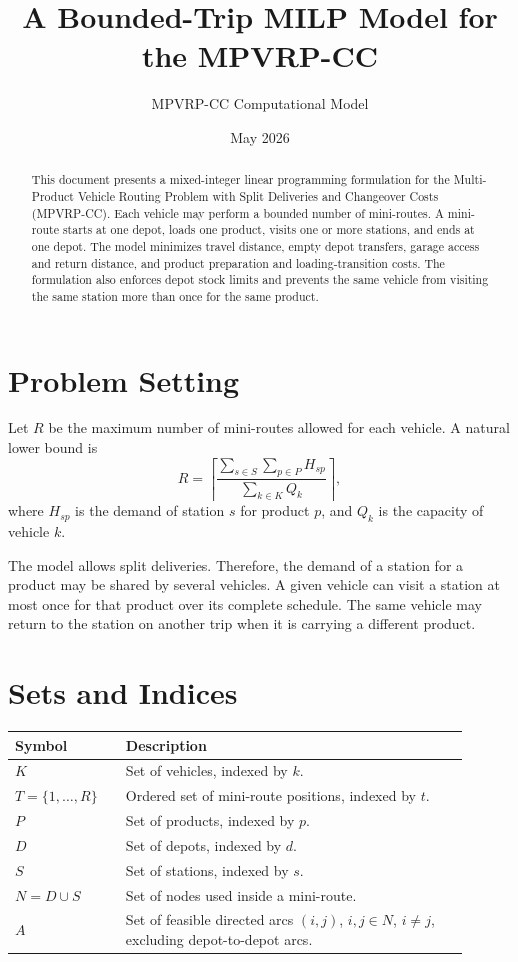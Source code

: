 \documentclass[11pt,a4paper]{article}
\title{\textbf{A Bounded-Trip MILP Model for the MPVRP-CC}}
\author{MPVRP-CC Computational Model}
\date{May 2026}
\begin{document}
\maketitle

\begin{abstract}
This document presents a mixed-integer linear programming formulation for the
Multi-Product Vehicle Routing Problem with Split Deliveries and Changeover
Costs (MPVRP-CC). Each vehicle may perform a bounded
number of mini-routes. A mini-route starts at one depot, loads one product,
visits one or more stations, and ends at one depot. The model minimizes travel
distance, empty depot transfers, garage access and return distance, and product
preparation and loading-transition costs. The formulation also enforces depot stock limits and prevents
the same vehicle from visiting the same station more than once for the same
product.
\end{abstract}

\section{Problem Setting}

Let \(R\) be the maximum number of mini-routes allowed for each vehicle. A
natural lower bound is
\[
    R =
    \left\lceil
    \frac{\sum_{s \in S}\sum_{p \in P} H_{sp}}
         {\sum_{k \in K} Q_k}
    \right\rceil ,
\]
where \(H_{sp}\) is the demand of station \(s\) for product \(p\), and \(Q_k\)
is the capacity of vehicle \(k\).

The model allows split deliveries. Therefore, the demand of a station for a
product may be shared by several vehicles. A given vehicle can visit a station
at most once for that product over its complete schedule. The same vehicle may
return to the station on another trip when it is carrying a different product.

\section{Sets and Indices}

\begin{table}[h]
\centering
\begin{tabular}{p{0.22\linewidth}p{0.68\linewidth}}
\toprule
Symbol & Description \\
\midrule
\(K\) & Set of vehicles, indexed by \(k\). \\
\(T=\{1,\ldots,R\}\) & Ordered set of mini-route positions, indexed by \(t\). \\
\(P\) & Set of products, indexed by \(p\). \\
\(D\) & Set of depots, indexed by \(d\). \\
\(S\) & Set of stations, indexed by \(s\). \\
\(N=D \cup S\) & Set of nodes used inside a mini-route. \\
\(A\) & Set of feasible directed arcs \((i,j)\), \(i,j \in N\), \(i\neq j\), excluding depot-to-depot arcs. \\
\bottomrule
\end{tabular}
\end{table}
\end{document}
